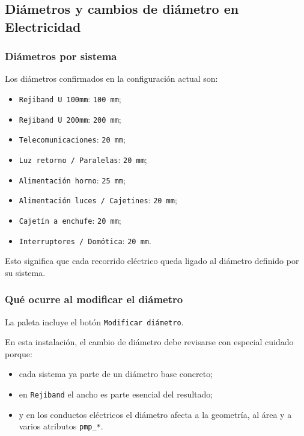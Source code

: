 \subsection{Diámetros y cambios de diámetro en Electricidad}

\subsubsection{Diámetros por sistema}

Los diámetros confirmados en la configuración actual son:

\begin{itemize}
\item \texttt{Rejiband U 100mm}: \texttt{100 mm};
\item \texttt{Rejiband U 200mm}: \texttt{200 mm};
\item \texttt{Telecomunicaciones}: \texttt{20 mm};
\item \texttt{Luz retorno / Paralelas}: \texttt{20 mm};
\item \texttt{Alimentación horno}: \texttt{25 mm};
\item \texttt{Alimentación luces / Cajetines}: \texttt{20 mm};
\item \texttt{Cajetín a enchufe}: \texttt{20 mm};
\item \texttt{Interruptores / Domótica}: \texttt{20 mm}.
\end{itemize}

Esto significa que cada recorrido eléctrico queda ligado al diámetro definido por su sistema.


\subsubsection{Qué ocurre al modificar el diámetro}

La paleta incluye el botón \texttt{Modificar diámetro}.

En esta instalación, el cambio de diámetro debe revisarse con especial cuidado porque:

\begin{itemize}
\item cada sistema ya parte de un diámetro base concreto;
\item en \texttt{Rejiband} el ancho es parte esencial del resultado;
\item y en los conductos eléctricos el diámetro afecta a la geometría, al área y a varios atributos \texttt{pmp\_*}.
\end{itemize}

